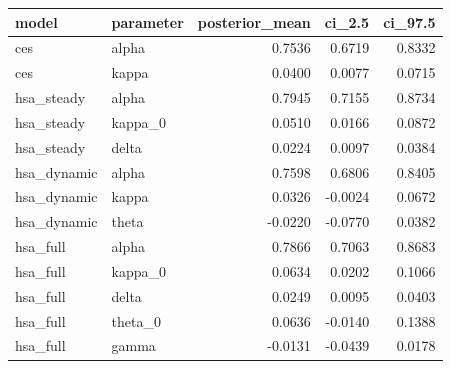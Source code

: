 \begin{tabular}{llrrr}
\toprule
model & parameter & posterior\_mean & ci\_2.5 & ci\_97.5 \\
\midrule
ces & alpha & 0.7536 & 0.6719 & 0.8332 \\
ces & kappa & 0.0400 & 0.0077 & 0.0715 \\
hsa\_steady & alpha & 0.7945 & 0.7155 & 0.8734 \\
hsa\_steady & kappa\_0 & 0.0510 & 0.0166 & 0.0872 \\
hsa\_steady & delta & 0.0224 & 0.0097 & 0.0384 \\
hsa\_dynamic & alpha & 0.7598 & 0.6806 & 0.8405 \\
hsa\_dynamic & kappa & 0.0326 & -0.0024 & 0.0672 \\
hsa\_dynamic & theta & -0.0220 & -0.0770 & 0.0382 \\
hsa\_full & alpha & 0.7866 & 0.7063 & 0.8683 \\
hsa\_full & kappa\_0 & 0.0634 & 0.0202 & 0.1066 \\
hsa\_full & delta & 0.0249 & 0.0095 & 0.0403 \\
hsa\_full & theta\_0 & 0.0636 & -0.0140 & 0.1388 \\
hsa\_full & gamma & -0.0131 & -0.0439 & 0.0178 \\
\bottomrule
\end{tabular}
